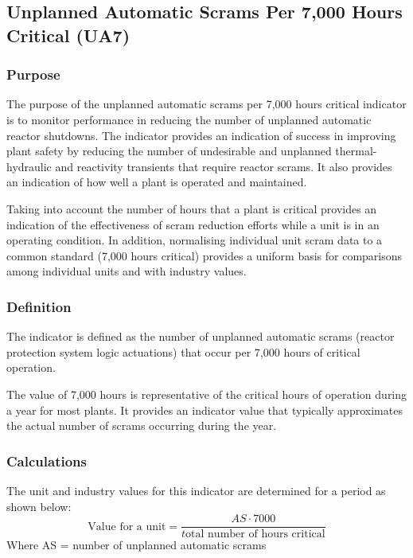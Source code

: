 \subsection{Unplanned Automatic Scrams Per 7,000 Hours Critical (UA7)}

\subsubsection{Purpose}

The purpose of the unplanned automatic scrams per 7,000 hours critical
indicator is to monitor performance in reducing the number of
unplanned automatic reactor shutdowns. The indicator provides an
indication of success in improving plant safety by reducing the number
of undesirable and unplanned thermal-hydraulic and reactivity
transients that require reactor scrams. It also provides an indication
of how well a plant is operated and maintained. 

Taking into account the number of hours that a plant is critical
provides an indication of the effectiveness of scram reduction efforts
while a unit is in an operating condition. In addition, normalising
individual unit scram data to a common standard (7,000 hours critical)
provides a uniform basis for comparisons among individual units and
with industry values. 

\subsubsection{Definition}

The indicator is defined as the number of unplanned automatic scrams
(reactor protection system logic actuations) that occur per 7,000
hours of critical operation.
 
The value of 7,000 hours is representative of the critical hours of
operation during a year for most plants. It provides an indicator
value that typically approximates the actual number of scrams
occurring during the year.

\subsubsection{Calculations}

The unit and industry values for this indicator are determined for a period as shown below:  
$$ \text{Value for a unit} = \frac{AS \cdot 7000}{t\text{otal number of hours critical}} $$	
Where 	AS = number of unplanned automatic scrams

